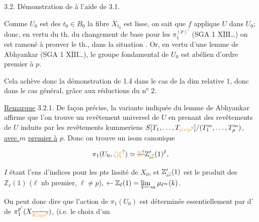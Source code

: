 3.2. Démonstration de  à l'aide de 3.1.

Comme $U_0$ est  des $t_0\in B_0$  la fibre $\overline X_{t_0}$ est lisse, on sait que $f$ applique $U$ dans $U_0$; donc,   en vertu du th. du changement de base pour les $\pi_1^{(p)'}$ (SGA 1 $\overline{\underline{\mathrm{XIII}}}$\ldots) on est ramené à prouver le th.,  dans la situation . Or, en vertu d'une  lemme de Abhyankar (SGA 1 $\overline{\underline{\mathrm{XIII}}}$\ldots), le groupe fondamental de $U_0$ est  abélien d'ordre premier à $p$.

Cela achève donc la démonstration de 1.4 dans le cas  de la dim relative 1,  donc dans le cas général, grâce aux réductions du n° 2.

\uline{Remarque} 3.2.1. De façon précise, la variante indiquée du lemme de Abhyankar affirme que l'on trouve un revêtement universel de $U$ en prenant  des revêtements de $U$ induits par les revêtements kummeriens $S[T_1,\ldots,T_{\unsure{\rho|r|p}}]/(T_1^m,\ldots,T_\rho^m)$, \uline{avec $m$} \uline{premier à} $p$. Donc on trouve un isom canonique

\[
\pi_1(U_0,\unsure{\zeta|\xi})\simeq \deleted{\unsure{\mathbb Z}}\mathbb Z'_{\deleted{\unsure{\ell}}}(1)^I,
\]

$I$ étant l'ens d'indices pour  les pts  lissité de $X_0$, et $\mathbb Z'_{\deleted{\unsure{\ell}}}(1)$ est le produit des $\mathbb Z_\ell(1)$ ($\ell$ nb premier,  $\ell\ne p$), $\leftarrow\mathbb Z_\ell(1)=\varprojlim_m\mu_{\ell^m}(k)$.

On peut donc dire que l'action de $\pi_1(U_0)$ est déterminée essentiellement par   d'  de $\pi_1^{p'}(X_{\overline{\unsure{K|\eta|s}}})$,  (i.e. le choix d'un

